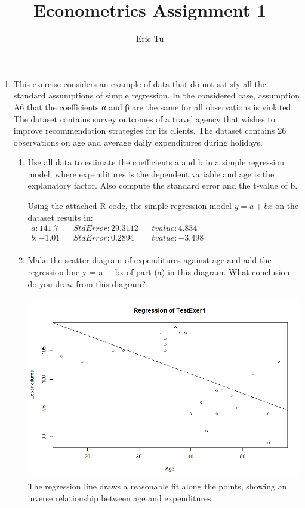 \documentclass{article}
\begin{document}
\title{Econometrics Assignment 1}
\author{Eric Tu}
\maketitle
\begin{enumerate}
	\item This exercise considers an example of data that do not satisfy all the standard assumptions of simple regression.
In the considered case, assumption A6 that the coefficients α and β are the same for all observations is violated.
The dataset contains survey outcomes of a travel agency that wishes to improve recommendation strategies for its
clients. The dataset contains 26 observations on age and average daily expenditures during holidays.
\\
	\begin{enumerate}
		\item Use all data to estimate the coefficients a and b in a simple regression model, where expenditures is the
dependent variable and age is the explanatory factor. Also compute the standard error and the t-value of b. \\

		\begin{center}
		Using the attached R code, the simple regression model $y = a + bx$ on the dataset results in: \\
		$\begin{matrix}
		a: 141.7 && Std Error: 29.3112 && tvalue: 4.834 \\
		b: -1.01 && Std Error: 0.2894 && tvalue: -3.498  \\
		\end{matrix}$
		
		
		\end{center}

		\item Make the scatter diagram of expenditures against age and add the regression line y = a + bx of part (a) in
this diagram. What conclusion do you draw from this diagram? \\
		\begin{center}
			\includegraphics[scale=0.5]{Rplot.png} \\
			The regression line draws a reasonable fit along the points, showing an inverse relationship between age and expenditures.
		\end{center}



\end{enumerate}
\end{enumerate}
\end{document}
